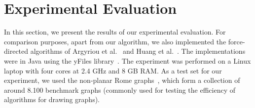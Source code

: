 \documentclass[runningheads]{llncs}
\begin{document}


\section{Experimental Evaluation}
\label{sec:experiments}

In this section, we present the results of our experimental evaluation. For comparison purposes, apart from our algorithm, we also implemented the force-directed algorithms of Argyriou et al.~\cite{DBLP:journals/cj/ArgyriouBS13} and Huang et al.~\cite{DBLP:journals/vlc/HuangEHL13}. The implementations were in Java using the yFiles library~\cite{DBLP:books/sp/04/WieseE004}. The experiment was performed on a Linux laptop with four cores at 2.4 GHz and 8 GB RAM.
%
As a test set for our experiment, we used the non-planar Rome graphs~\cite{DBLP:reference/crc/BattistaD13}, which form a collection of around 8.100 benchmark graphs (commonly used for testing the efficiency of algorithms for drawing graphs). 
\end{document}
